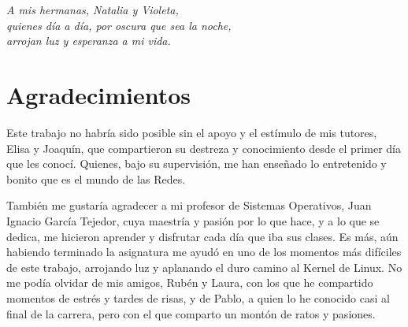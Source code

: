 

\cleardoublepage %
\chapter*{}
\setlength{\leftmargin}{0.5\textwidth}
\setlength{\parsep}{0cm}
\addtolength{\topsep}{0.5cm}
\begin{flushright}
	\small\em{
		A mis hermanas, Natalia y Violeta,\\
		quienes día a día, por oscura que sea la noche,\\
		arrojan luz y esperanza a mi vida.
	}
\end{flushright}




\chapter*{Agradecimientos}

\thispagestyle{empty}
\vspace{1cm}

Este trabajo no habría sido posible sin el apoyo y el estímulo de mis tutores, Elisa y Joaquín, que compartieron su destreza y conocimiento desde el primer día que les conocí. Quienes, bajo su supervisión, me han enseñado lo entretenido y bonito que es el mundo de las Redes. \newline

También me gustaría agradecer a mi profesor de Sistemas Operativos, Juan Ignacio García Tejedor, cuya maestría y pasión por lo que hace, y a lo que se dedica, me hicieron aprender y disfrutar cada día que iba sus clases. Es más, aún habiendo terminado la asignatura me ayudó en uno de los momentos más difíciles de este trabajo, arrojando luz y aplanando el duro camino al Kernel de Linux. No me podía olvidar de mis amigos, Rubén y Laura, con los que he compartido momentos de estrés y tardes de risas, y de Pablo, a quien lo he conocido casi al final de la carrera, pero con el que comparto un montón de ratos y pasiones. \newline

